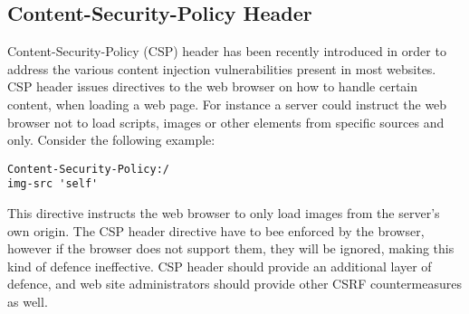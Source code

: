 \subsection{Content-Security-Policy Header}
Content-Security-Policy (CSP) header has been recently introduced in order to address the various content injection vulnerabilities
present in most websites.  CSP header issues directives to the web browser on how to handle certain content, when loading
a web page.  For instance a server could instruct the web browser not to load scripts, images or other elements from
specific sources and only. Consider the following example:
\begin{lstlisting}
Content-Security-Policy:/
img-src 'self'
\end{lstlisting}
This directive instructs the web browser to only load images from the server's own origin.  The CSP header directive 
have to bee enforced by the browser, however if the browser does not support them, they will be ignored, making this 
kind of defence ineffective.  CSP header should provide an additional layer of defence, and web site administrators
should provide other CSRF countermeasures as well.
